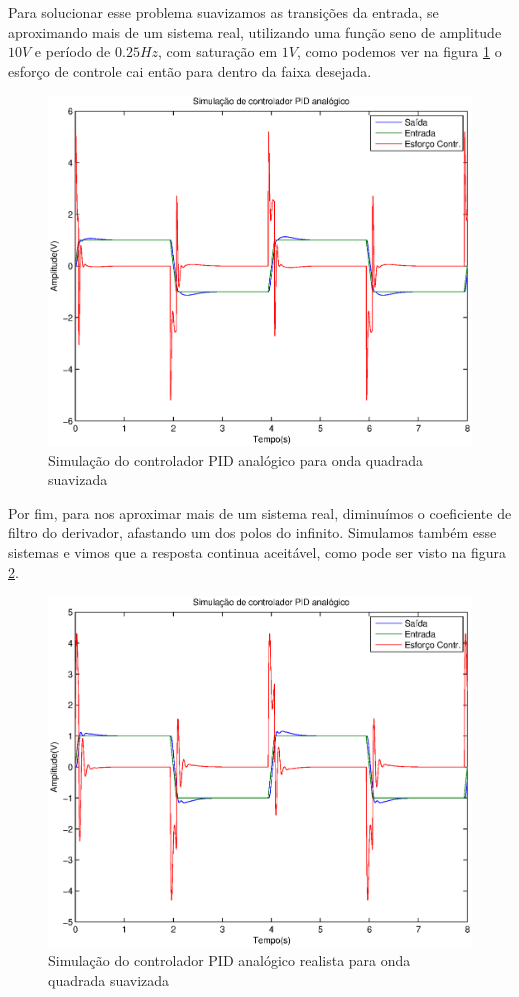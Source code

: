 \documentclass{article}
\begin{document}
Para solucionar esse problema suavizamos as transições da entrada, se aproximando mais de um sistema real, utilizando uma função seno de amplitude $10V$ e período de $0.25Hz$, com saturação em $1V$, como podemos ver na figura \ref{fig:yrusimpid} o esforço de controle cai então para dentro da faixa desejada. 
\begin{figure}[H]
\centering
\includegraphics[width=0.8\linewidth]{yru1000sin}
\caption{Simulação do controlador PID analógico para onda quadrada suavizada}
\label{fig:yrusimpid}
\end{figure}

Por fim, para nos aproximar mais de um sistema real, diminuímos o coeficiente de filtro do derivador, afastando um dos polos do infinito. Simulamos também esse sistemas e vimos que a resposta continua aceitável, como pode ser visto na figura \ref{fig:yrusimpid100}.
\begin{figure}[H]
	\centering
	\includegraphics[width=0.8\linewidth]{yru100sin}
	\caption{Simulação do controlador PID analógico realista para onda quadrada suavizada}
	\label{fig:yrusimpid100}
\end{figure}
\end{document}
